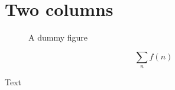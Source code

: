 \documentclass{article}
\begin{document}
\twocolumn
\section*{Two columns}
\blindtext[3]
\begin{figure}
  \centering
  \caption{A dummy figure}
\end{figure}
\begin{gridenv}
  \begin{equation}
    \sum_n f(n)
  \end{equation}
\end{gridenv}
Text
\end{document}
